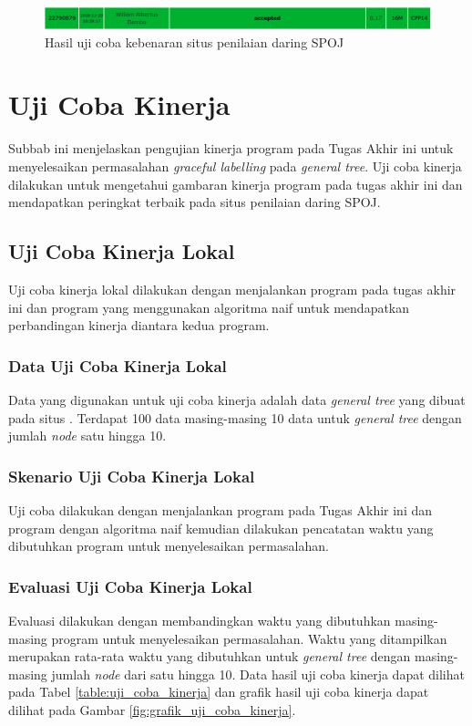 \begin{figure}[ht]
	\centering\includegraphics[width=1\textwidth]{bab5/figures/status_spoj.png}
	\caption{Hasil uji coba kebenaran situs penilaian daring SPOJ}
	\label{fig:status_spoj}
\end{figure}

\section{Uji Coba Kinerja}
Subbab ini menjelaskan pengujian kinerja program pada Tugas Akhir ini untuk menyelesaikan permasalahan \textit{graceful labelling} pada \textit{general tree}. Uji coba kinerja dilakukan untuk mengetahui gambaran kinerja program pada tugas akhir ini dan mendapatkan peringkat terbaik pada situs penilaian daring SPOJ.

\subsection{Uji Coba Kinerja Lokal}
Uji coba kinerja lokal dilakukan dengan menjalankan program pada tugas akhir ini dan program yang menggunakan algoritma naif untuk mendapatkan perbandingan kinerja diantara kedua program.

\subsubsection{Data Uji Coba Kinerja Lokal}
Data yang digunakan untuk uji coba kinerja adalah data \textit{general tree} yang dibuat pada situs \problem\cite{SPOJTOOLKIT}. Terdapat 100 data masing-masing 10 data untuk \textit{general tree} dengan jumlah \textit{node} satu hingga 10.

\subsubsection{Skenario Uji Coba Kinerja Lokal}
Uji coba dilakukan dengan menjalankan program pada Tugas Akhir ini dan program dengan algoritma naif kemudian dilakukan pencatatan waktu yang dibutuhkan program untuk menyelesaikan permasalahan.

\subsubsection{Evaluasi Uji Coba Kinerja Lokal}
Evaluasi dilakukan dengan membandingkan waktu yang dibutuhkan masing-masing program untuk menyelesaikan permasalahan. Waktu yang ditampilkan merupakan rata-rata waktu yang dibutuhkan untuk \textit{general tree} dengan masing-masing jumlah \textit{node} dari satu hingga 10. Data hasil uji coba kinerja dapat dilihat pada Tabel \ref{table:uji_coba_kinerja} dan grafik hasil uji coba kinerja dapat dilihat pada Gambar \ref{fig:grafik_uji_coba_kinerja}.

